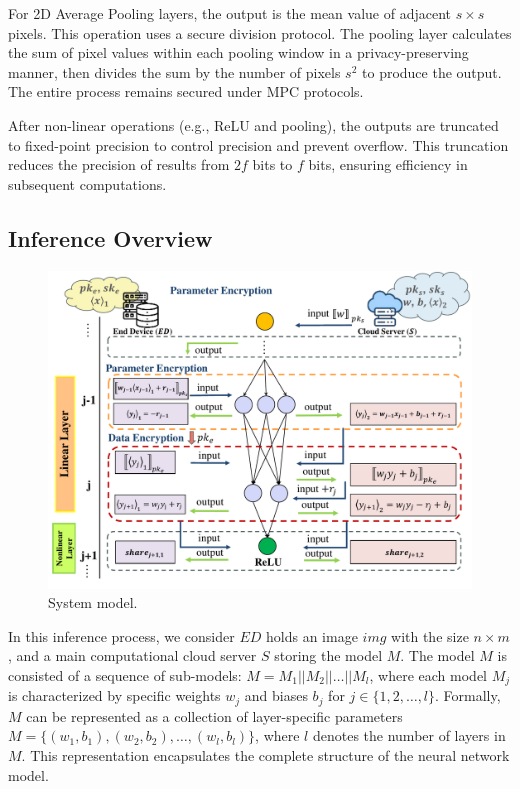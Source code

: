 \documentclass[conference]{IEEEtran}
\begin{document}
For 2D Average Pooling layers, the output is the mean value of adjacent $s \times s$ pixels. This operation uses a secure division protocol. The pooling layer calculates the sum of pixel values within each pooling window in a privacy-preserving manner, then divides the sum by the number of pixels $s^2$ to produce the output. The entire process remains secured under MPC protocols.

After non-linear operations (e.g., ReLU and pooling), the outputs are truncated to fixed-point precision to control precision and prevent overflow. This truncation reduces the precision of results from $2f$ bits to $f$ bits, ensuring efficiency in subsequent computations.

\subsection{Inference Overview}



\begin{figure}[ht]
\includegraphics[width=1\linewidth]{fig3.pdf}
\caption{System model.} \label{fig:MIND Overview}
\end{figure}

In this inference process, we consider $ED$ holds an image $img$ with the size $n\times m$, and a main computational cloud server $S$ storing the model $M$. The model $M$ is consisted of a sequence of sub-models: $M=M_1 || M_2 || \dots || M_l$, where each model $M_j$ is characterized by specific weights $w_{j}$ and biases $b_{j}$ for $j \in \{1, 2, \dots, l\}$. Formally, $M$ can be represented as a collection of layer-specific parameters $M=\{(w_{1},b_{1}),(w_{2},b_{2}),\dots,(w_{l},b_{l})\}$, where $l$ denotes the number of layers in $M$. This representation encapsulates the complete structure of the neural network model.
\end{document}
